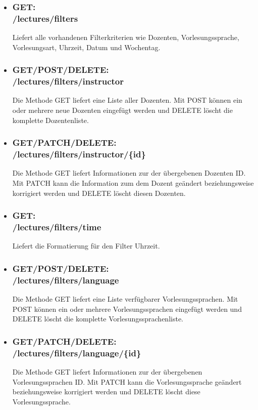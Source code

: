 \begin{itemize}
\item \subsubsection{GET:\\ /lectures/filters}
Liefert alle vorhandenen Filterkriterien wie Dozenten, Vorlesungssprache, Vorlesungsart, Uhrzeit, Datum und Wochentag.
\item \subsubsection{GET/POST/DELETE:\\ /lectures/filters/instructor} 
Die Methode GET liefert eine Liste aller Dozenten. Mit POST können ein oder mehrere neue Dozenten eingefügt werden und DELETE löscht die komplette Dozentenliste.
\item \subsubsection{GET/PATCH/DELETE:\\ /lectures/filters/instructor/\{id\}}
Die Methode GET liefert Informationen zur der übergebenen Dozenten ID. Mit PATCH kann die Information zum dem Dozent geändert beziehungsweise korrigiert werden und DELETE löscht diesen Dozenten.
\item \subsubsection{GET:\\ /lectures/filters/time} 
Liefert die Formatierung für den Filter Uhrzeit.
\item \subsubsection{GET/POST/DELETE:\\ /lectures/filters/language} 
Die Methode GET liefert eine Liste verfügbarer Vorlesungssprachen. Mit POST können ein oder mehrere Vorlesungssprachen eingefügt werden und DELETE löscht die komplette Vorlesungssprachenliste.
\item \subsubsection{GET/PATCH/DELETE:\\ /lectures/filters/language/\{id\}} 
Die Methode GET liefert Informationen zur der übergebenen Vorlesungssprachen ID. Mit PATCH kann die Vorlesungssprache geändert beziehungsweise korrigiert werden und DELETE löscht diese Vorlesungssprache.

\end{itemize}
